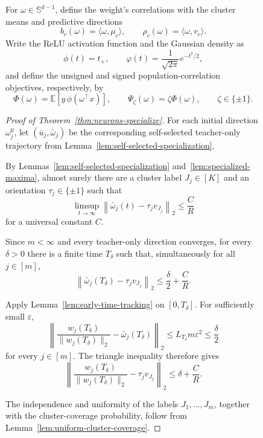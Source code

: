 \documentclass{article}
\begin{document}
\begin{figure}
{For $\omega\in\mathbb S^{d-1}$, define the weight's correlations with the cluster means and predictive directions
\[
    b_c(\omega)
    =
    \langle\omega,\mu_c\rangle,
    \qquad
    \rho_c(\omega)
    =
    \langle\omega,v_c\rangle.
\]
}
Write the ReLU activation function and the Gaussian density as
\[
    \phi(t)=t_+,
    \qquad
    \varphi(t)
    =
    \frac{1}{\sqrt{2\pi}}e^{-t^2/2},
\]
and define the unsigned and signed population-correlation objectives, respectively, by
\[
    \Phi({\omega})
    =
    \mathbb E\left[{y}\,
      \phi({\omega}^\top{x})\right],
    \qquad
    \Psi_\zeta({\omega})
    =
    \zeta\Phi({\omega}),
    \qquad
    \zeta\in\{\pm1\}.
\]

\begin{proof}[Proof of Theorem~\ref{thm:neurons-specialize}]
For each initial direction ${\omega_j^0}$, let
$(\bar u_j,{\bar\omega_j})$ be the corresponding self-selected teacher-only
trajectory from Lemma~\ref{lem:self-selected-specialization}.

By Lemmas~\ref{lem:self-selected-specialization}
and~\ref{lem:specialized-maxima}, almost surely there are a cluster label
$J_j\in[K]$ and an orientation $\tau_j\in\{\pm1\}$ such that
\[
    \limsup_{t\to\infty}
    \left\|
        {\bar\omega_j(t)-\tau_j v_{J_j}}
    \right\|_2
    \leq
    \frac{C}{R}
\]
for a universal constant $C$.

Since $m<\infty$ and every teacher-only direction converges, for every
$\delta>0$ there is a finite time $T_\delta$ such that, simultaneously for
all $j\in[m]$,
\[
    \left\|
        {\bar\omega_j(T_\delta)-\tau_j v_{J_j}}
    \right\|_2
    \leq
    \frac{\delta}{2}+\frac{C}{R}.
\]

Apply Lemma~\ref{lem:early-time-tracking} on $[0,T_\delta]$. For sufficiently
small $\varepsilon$,
\[
    \left\|
        \frac{w_j(T_\delta)}{\|w_j(T_\delta)\|_2}
        -
        {\bar\omega_j(T_\delta)}
    \right\|_2
    \leq
    L_{T_\delta}m\varepsilon^2
    \leq
    \frac{\delta}{2}
\]
for every $j\in[m]$. The triangle inequality therefore gives
\[
    \left\|
        \frac{w_j(T_\delta)}{\|w_j(T_\delta)\|_2}
        -
        \tau_j {v_{J_j}}
    \right\|_2
    \leq
    \delta+\frac{C}{R}.
\]

The independence and uniformity of the labels $J_1,\ldots,J_m$, together
with the cluster-coverage probability, follow from
Lemma~\ref{lem:uniform-cluster-coverage}.
\end{proof}

{
\begin{figure}[omitted: a diagram of this paper's results, not reproduced here]\label{fig:theorem1-dependencies}\end{figure}
}
\clearpage


\end{figure}
\end{document}
